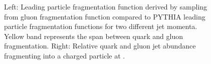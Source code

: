 \documentclass[12pt]{article}
\begin{document}
\begin{figure}[htbp]
   \centering
   \caption{Left: Leading particle fragmentation function  derived by sampling from gluon fragmentation function  
   compared to PYTHIA leading particle fragmentation functions for two different jet momenta. Yellow band represents the span between
   quark and gluon fragmentation.  Right: Relative quark and gluon jet abundance fragmenting into a charged particle at  \cite{Jager:2002xm}. }  
\end{figure}
\end{document}
